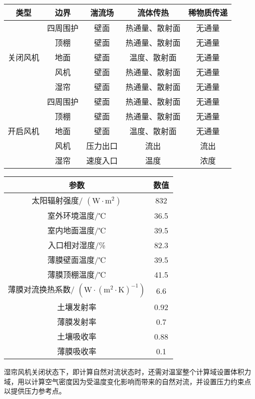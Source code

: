 		\begin{table}[!htbp]
  			\centering
  			\begin{tabular}{ccccc} \toprule
			类型	 & 边界 & 湍流场 & 	流体传热 & 	稀物质传递\\ \midrule
			\multirow{5}{*}{关闭风机} & 四周围护 & 壁面 & 热通量、散射面 & 无通量\\ 
												  & 顶棚  & 壁面 & 热通量、散射面 & 无通量\\
												  & 地面 & 壁面 & 温度、散射面 & 无通量\\
												  & 风机 & 壁面 & 热通量、散射面 & 无通量\\
												  & 湿帘 & 壁面 & 热通量、散射面 & 无通量\\ \midrule
			\multirow{5}{*}{开启风机} & 四周围护 & 壁面 & 热通量、散射面 & 无通量\\
												  & 顶棚 & 壁面	 & 热通量、散射面	 & 无通量\\
												  & 地面 &  壁面 & 温度、散射面	 & 无通量\\
												  & 风机 &  压力出口 & 	流出 & 	流出\\
												  & 湿帘 & 速度入口	 & 温度 & 浓度\\ \bottomrule
 			\end{tabular}
		\end{table}	
		\begin{table}[!htbp]
  			\centering
  			\begin{tabular}{cc} \toprule
			参数 & 数值\\ \midrule
			太阳辐射强度/ $(\text{W} \cdot \text{m}^{2})$ & 	832\\
			室外环境温度/℃	 & 36.5\\
			室内地面温度/℃ & 	39.5\\
			入口相对湿度/\%	 & 82.3\\
			薄膜壁面温度/℃	 & 39.5\\
			薄膜顶棚温度/℃	 & 41.5\\
			薄膜对流换热系数/ $(\text{W} \cdot (\text{m}^{2} \cdot \text{K})^{-1})$ & 6.6\\
			土壤发射率 & 0.92\\
			薄膜发射率 & 0.7\\
			土壤吸收率 & 0.88\\
			薄膜吸收率 & 0.1\\ \bottomrule
 			\end{tabular}
		\end{table}
湿帘风机关闭状态下，即计算自然对流状态时，还需对温室整个计算域设置体积力域，用以计算空气密度因为受温度变化影响而带来的自然对流，并设置压力约束点以提供压力参考点。

